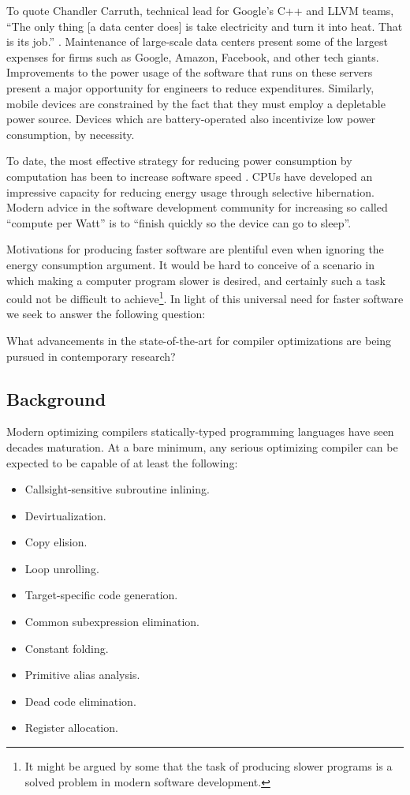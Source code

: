 \documentclass[nobib]{tufte-handout}
\begin{document}
To quote Chandler Carruth, technical lead for Google's C++ and LLVM teams, ``The only thing [a data center does] is take electricity and turn it into heat.  That is its job.'' \cite{Carruth}.  Maintenance of large-scale data centers present some of the largest expenses for firms such as Google, Amazon, Facebook, and other tech giants.  Improvements to the power usage of the software that runs on these servers present a major opportunity for engineers to reduce expenditures.  Similarly, mobile devices are constrained by the fact that they must employ a depletable power source.  Devices which are battery-operated also incentivize low power consumption, by necessity.

To date, the most effective strategy for reducing power consumption by computation has been to increase software speed \cite{Carruth}.  CPUs have developed an impressive capacity for reducing energy usage through selective hibernation.  Modern advice in the software development community for increasing so called ``compute per Watt'' is to ``finish quickly so the device can go to sleep''.

Motivations for producing faster software are plentiful even when ignoring the energy consumption argument.  It would be hard to conceive of a scenario in which making a computer program slower is desired, and certainly such a task could not be difficult to achieve\footnote{It might be argued by some that the task of producing slower programs is a solved problem in modern software development.}.  In light of this universal need for faster software we seek to answer the following question:

\begin{displayquote}
What advancements in the state-of-the-art for compiler optimizations are being pursued in contemporary research?
\end{displayquote}




\subsection{Background}
Modern optimizing compilers statically-typed programming languages have seen decades maturation.  At a bare minimum, any serious optimizing compiler can be expected to be capable of at least the following:
\begin{itemize}
\item Callsight-sensitive subroutine inlining.
\item Devirtualization. 
\item Copy elision.
\item Loop unrolling. 
\item Target-specific code generation.  
\item Common subexpression elimination.
\item Constant folding.
\item Primitive alias analysis. 
\item Dead code elimination.
\item Register allocation.
\end{itemize}
\end{document}
